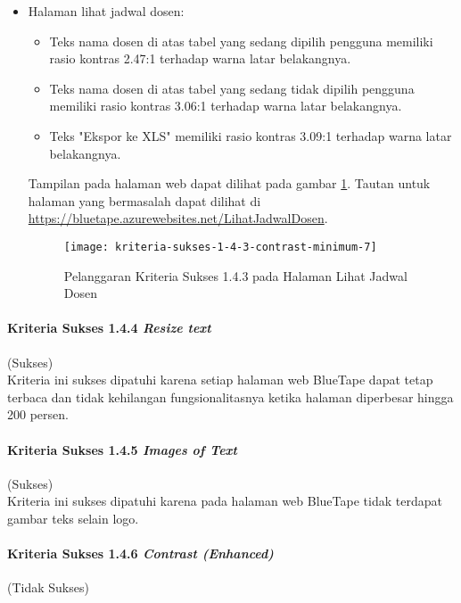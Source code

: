 \begin{itemize}
    \item Halaman lihat jadwal dosen: 
    \begin{itemize}
        \item Teks nama dosen di atas tabel yang sedang dipilih pengguna memiliki rasio kontras 2.47:1 terhadap warna latar belakangnya.
        \item Teks nama dosen di atas tabel yang sedang tidak dipilih pengguna memiliki rasio kontras 3.06:1 terhadap warna latar belakangnya.
        \item Teks "Ekspor ke XLS" memiliki rasio kontras 3.09:1 terhadap warna latar belakangnya.
    \end{itemize}
    Tampilan pada halaman web dapat dilihat pada gambar \ref{fig:1.4.3_contrast_minimum_7}. Tautan untuk halaman yang bermasalah dapat dilihat di \url{https://bluetape.azurewebsites.net/LihatJadwalDosen}.
    \begin{figure}[H]
        \centering  
        \texttt{[image: kriteria-sukses-1-4-3-contrast-minimum-7]}  
        \caption[Pelanggaran Kriteria Sukses 1.4.3 pada Halaman Lihat Jadwal Dosen]{Pelanggaran Kriteria Sukses 1.4.3 pada Halaman Lihat Jadwal Dosen}
        \label{fig:1.4.3_contrast_minimum_7}  
    \end{figure} 
\end{itemize}

\paragraph{Kriteria Sukses 1.4.4 \textit{Resize text}}
\label{par:kepatuhan_bluetape_kriteria_sukses_1.4.4}
(Sukses)\\

Kriteria ini sukses dipatuhi karena setiap halaman web BlueTape dapat tetap terbaca dan tidak kehilangan fungsionalitasnya ketika halaman diperbesar hingga 200 persen. 

\paragraph{Kriteria Sukses 1.4.5 \textit{Images of Text}}
\label{par:kepatuhan_bluetape_kriteria_sukses_1.4.5}
(Sukses)\\

Kriteria ini sukses dipatuhi karena pada halaman web BlueTape tidak terdapat gambar teks selain logo.

\paragraph{Kriteria Sukses 1.4.6 \textit{Contrast (Enhanced)}}
\label{par:kepatuhan_bluetape_kriteria_sukses_1.4.6}
(Tidak Sukses)\\

